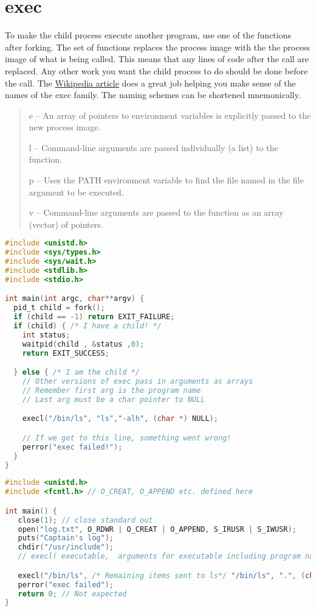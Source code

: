 \section{exec}

To make the child process execute another program, use one of the \href{http://man7.org/linux/man-pages/man3/exec.3.html}{} functions after forking. The  set of functions replaces the process image with the the process image of what is being called. This means that any lines of code after the  call are replaced. Any other work you want the child process to do should be done before the  call. The \href{https://en.wikipedia.org/wiki/Exec_(system_call)\#C_language_prototypes}{Wikipedia article} does a great job helping you make sense of the names of the exec family. The naming schemes can be shortened mnemonically.

\begin{quote}
e -- An array of pointers to environment variables is explicitly passed to the new process image.

l -- Command-line arguments are passed individually (a list) to the function.

p -- Uses the PATH environment variable to find the file named in the file argument to be executed.

v -- Command-line arguments are passed to the function as an array (vector) of pointers.
\end{quote}

\begin{lstlisting}[language=C]
#include <unistd.h>
#include <sys/types.h> 
#include <sys/wait.h>
#include <stdlib.h>
#include <stdio.h>

int main(int argc, char**argv) {
  pid_t child = fork();
  if (child == -1) return EXIT_FAILURE;
  if (child) { /* I have a child! */
    int status;
    waitpid(child , &status ,0);
    return EXIT_SUCCESS;

  } else { /* I am the child */
    // Other versions of exec pass in arguments as arrays
    // Remember first arg is the program name
    // Last arg must be a char pointer to NULL

    execl("/bin/ls", "ls","-alh", (char *) NULL);

    // If we get to this line, something went wrong!
    perror("exec failed!");
  }
}
\end{lstlisting}

\begin{lstlisting}[language=C]
#include <unistd.h>
#include <fcntl.h> // O_CREAT, O_APPEND etc. defined here

int main() {
   close(1); // close standard out
   open("log.txt", O_RDWR | O_CREAT | O_APPEND, S_IRUSR | S_IWUSR);
   puts("Captain's log");
   chdir("/usr/include");
   // execl( executable,  arguments for executable including program name and NULL at the end)

   execl("/bin/ls", /* Remaining items sent to ls*/ "/bin/ls", ".", (char *) NULL); // "ls ."
   perror("exec failed");
   return 0; // Not expected
}
\end{lstlisting}

